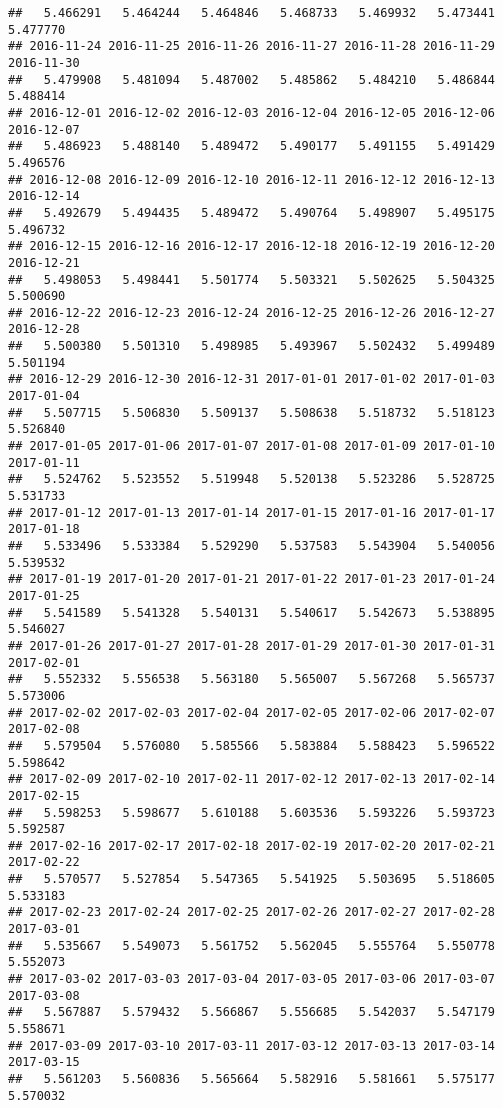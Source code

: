 \documentclass[
]{article}
\begin{document}
\begin{verbatim}
##   5.466291   5.464244   5.464846   5.468733   5.469932   5.473441   5.477770 
## 2016-11-24 2016-11-25 2016-11-26 2016-11-27 2016-11-28 2016-11-29 2016-11-30 
##   5.479908   5.481094   5.487002   5.485862   5.484210   5.486844   5.488414 
## 2016-12-01 2016-12-02 2016-12-03 2016-12-04 2016-12-05 2016-12-06 2016-12-07 
##   5.486923   5.488140   5.489472   5.490177   5.491155   5.491429   5.496576 
## 2016-12-08 2016-12-09 2016-12-10 2016-12-11 2016-12-12 2016-12-13 2016-12-14 
##   5.492679   5.494435   5.489472   5.490764   5.498907   5.495175   5.496732 
## 2016-12-15 2016-12-16 2016-12-17 2016-12-18 2016-12-19 2016-12-20 2016-12-21 
##   5.498053   5.498441   5.501774   5.503321   5.502625   5.504325   5.500690 
## 2016-12-22 2016-12-23 2016-12-24 2016-12-25 2016-12-26 2016-12-27 2016-12-28 
##   5.500380   5.501310   5.498985   5.493967   5.502432   5.499489   5.501194 
## 2016-12-29 2016-12-30 2016-12-31 2017-01-01 2017-01-02 2017-01-03 2017-01-04 
##   5.507715   5.506830   5.509137   5.508638   5.518732   5.518123   5.526840 
## 2017-01-05 2017-01-06 2017-01-07 2017-01-08 2017-01-09 2017-01-10 2017-01-11 
##   5.524762   5.523552   5.519948   5.520138   5.523286   5.528725   5.531733 
## 2017-01-12 2017-01-13 2017-01-14 2017-01-15 2017-01-16 2017-01-17 2017-01-18 
##   5.533496   5.533384   5.529290   5.537583   5.543904   5.540056   5.539532 
## 2017-01-19 2017-01-20 2017-01-21 2017-01-22 2017-01-23 2017-01-24 2017-01-25 
##   5.541589   5.541328   5.540131   5.540617   5.542673   5.538895   5.546027 
## 2017-01-26 2017-01-27 2017-01-28 2017-01-29 2017-01-30 2017-01-31 2017-02-01 
##   5.552332   5.556538   5.563180   5.565007   5.567268   5.565737   5.573006 
## 2017-02-02 2017-02-03 2017-02-04 2017-02-05 2017-02-06 2017-02-07 2017-02-08 
##   5.579504   5.576080   5.585566   5.583884   5.588423   5.596522   5.598642 
## 2017-02-09 2017-02-10 2017-02-11 2017-02-12 2017-02-13 2017-02-14 2017-02-15 
##   5.598253   5.598677   5.610188   5.603536   5.593226   5.593723   5.592587 
## 2017-02-16 2017-02-17 2017-02-18 2017-02-19 2017-02-20 2017-02-21 2017-02-22 
##   5.570577   5.527854   5.547365   5.541925   5.503695   5.518605   5.533183 
## 2017-02-23 2017-02-24 2017-02-25 2017-02-26 2017-02-27 2017-02-28 2017-03-01 
##   5.535667   5.549073   5.561752   5.562045   5.555764   5.550778   5.552073 
## 2017-03-02 2017-03-03 2017-03-04 2017-03-05 2017-03-06 2017-03-07 2017-03-08 
##   5.567887   5.579432   5.566867   5.556685   5.542037   5.547179   5.558671 
## 2017-03-09 2017-03-10 2017-03-11 2017-03-12 2017-03-13 2017-03-14 2017-03-15 
##   5.561203   5.560836   5.565664   5.582916   5.581661   5.575177   5.570032 

\end{verbatim}
\end{document}
